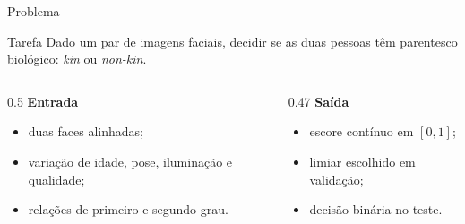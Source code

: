 \documentclass[aspectratio=169,10pt]{beamer}
\newcommand{\kin}{\textit{kin}}
\newcommand{\nonkin}{\textit{non-kin}}
\begin{document}
\begin{frame}{Problema}
  \begin{block}{Tarefa}
    Dado um par de imagens faciais, decidir se as duas pessoas têm parentesco biológico: \kin{} ou \nonkin{}.
  \end{block}

  \vspace{0.2cm}
  \begin{columns}[T,onlytextwidth]
    \begin{column}{0.5\textwidth}
      \textbf{Entrada}
      \begin{itemize}
        \item duas faces alinhadas;
        \item variação de idade, pose, iluminação e qualidade;
        \item relações de primeiro e segundo grau.
      \end{itemize}
    \end{column}
    \begin{column}{0.47\textwidth}
      \textbf{Saída}
      \begin{itemize}
        \item escore contínuo em $[0,1]$;
        \item limiar escolhido em validação;
        \item decisão binária no teste.
      \end{itemize}
    \end{column}
  \end{columns}
\end{frame}
\end{document}
